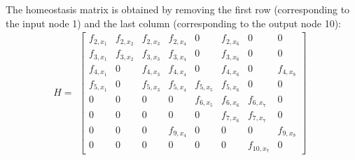 \documentclass[pdflatex,sn-basic,Numbered]{sn-jnl}
\theoremstyle{thmstyleone}%
\numberwithin{equation}{section}
\begin{document}
The homeostasis matrix is obtained by removing the first row (corresponding to the input node 1) and the last column (corresponding to the output node 10):
$$
H=\begin{gathered}
\left[
\begin{array}{cccccccc}
f_{2,x_1} & f_{2,x_2} & f_{2,x_3} & f_{2,x_4} & 0 & f_{2,x_6} & 0 & 0\\
f_{3,x_1} & f_{3,x_2} & f_{3,x_3} & f_{3,x_4} & 0 & f_{3,x_6} & 0 & 0\\
f_{4,x_1} & 0 & f_{4,x_3} & f_{4,x_4} & 0 & f_{4,x_6} & 0 & f_{4,x_9}\\
f_{5,x_1} & 0 & f_{5,x_3} & f_{5,x_4} & f_{5,x_5} & f_{5,x_6} & 0 & 0\\
0 & 0 & 0 & 0 & f_{6,x_5} & f_{6,x_6} & f_{6,x_7} & 0\\
0 & 0 & 0 & 0 & 0 & f_{7,x_6} & f_{7,x_7} & 0\\
0 & 0 & 0 & f_{9,x_4} & 0 & 0 & 0 & f_{9,x_9}\\
0 & 0 & 0 & 0 & 0 & 0 & f_{10,x_7} & 0
\end{array}
\right]
\end{gathered}
$$
\end{document}
